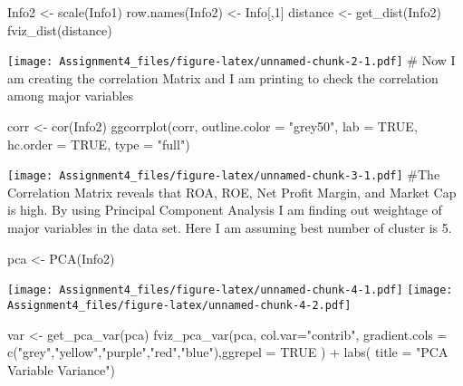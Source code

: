 \documentclass[
]{article}
\newenvironment{Shaded}{\begin{snugshade}}{\end{snugshade}}
\newcommand{\AttributeTok}[1]{\textcolor[rgb]{0.77,0.63,0.00}{#1}}
\newcommand{\ConstantTok}[1]{\textcolor[rgb]{0.00,0.00,0.00}{#1}}
\newcommand{\DecValTok}[1]{\textcolor[rgb]{0.00,0.00,0.81}{#1}}
\newcommand{\FunctionTok}[1]{\textcolor[rgb]{0.00,0.00,0.00}{#1}}
\newcommand{\NormalTok}[1]{#1}
\newcommand{\OtherTok}[1]{\textcolor[rgb]{0.56,0.35,0.01}{#1}}
\newcommand{\SpecialCharTok}[1]{\textcolor[rgb]{0.00,0.00,0.00}{#1}}
\newcommand{\StringTok}[1]{\textcolor[rgb]{0.31,0.60,0.02}{#1}}
\begin{document}
\begin{Shaded}
\begin{Highlighting}[]
\NormalTok{Info2 }\OtherTok{\textless{}{-}} \FunctionTok{scale}\NormalTok{(Info1)}
\FunctionTok{row.names}\NormalTok{(Info2) }\OtherTok{\textless{}{-}}\NormalTok{ Info[,}\DecValTok{1}\NormalTok{]}
\NormalTok{distance }\OtherTok{\textless{}{-}} \FunctionTok{get\_dist}\NormalTok{(Info2)}
\FunctionTok{fviz\_dist}\NormalTok{(distance)}
\end{Highlighting}
\end{Shaded}

\texttt{[image: Assignment4\_files/figure-latex/unnamed-chunk-2-1.pdf]}
\# Now I am creating the correlation Matrix and I am printing to check
the correlation among major variables

\begin{Shaded}
\begin{Highlighting}[]
\NormalTok{corr }\OtherTok{\textless{}{-}} \FunctionTok{cor}\NormalTok{(Info2)}
\FunctionTok{ggcorrplot}\NormalTok{(corr, }\AttributeTok{outline.color =} \StringTok{"grey50"}\NormalTok{, }\AttributeTok{lab =} \ConstantTok{TRUE}\NormalTok{, }\AttributeTok{hc.order =} \ConstantTok{TRUE}\NormalTok{, }\AttributeTok{type =} \StringTok{"full"}\NormalTok{) }
\end{Highlighting}
\end{Shaded}

\texttt{[image: Assignment4\_files/figure-latex/unnamed-chunk-3-1.pdf]}
\#The Correlation Matrix reveals that ROA, ROE, Net Profit Margin, and
Market Cap is high. By using Principal Component Analysis I am finding
out weightage of major variables in the data set. Here I am assuming
best number of cluster is 5.

\begin{Shaded}
\begin{Highlighting}[]
\NormalTok{pca }\OtherTok{\textless{}{-}} \FunctionTok{PCA}\NormalTok{(Info2)}
\end{Highlighting}
\end{Shaded}

\texttt{[image: Assignment4\_files/figure-latex/unnamed-chunk-4-1.pdf]}
\texttt{[image: Assignment4\_files/figure-latex/unnamed-chunk-4-2.pdf]}

\begin{Shaded}
\begin{Highlighting}[]
\NormalTok{var }\OtherTok{\textless{}{-}} \FunctionTok{get\_pca\_var}\NormalTok{(pca)}
\FunctionTok{fviz\_pca\_var}\NormalTok{(pca, }\AttributeTok{col.var=}\StringTok{"contrib"}\NormalTok{,}
             \AttributeTok{gradient.cols =} \FunctionTok{c}\NormalTok{(}\StringTok{"grey"}\NormalTok{,}\StringTok{"yellow"}\NormalTok{,}\StringTok{"purple"}\NormalTok{,}\StringTok{"red"}\NormalTok{,}\StringTok{"blue"}\NormalTok{),}\AttributeTok{ggrepel =} \ConstantTok{TRUE}\NormalTok{ ) }\SpecialCharTok{+} \FunctionTok{labs}\NormalTok{( }\AttributeTok{title =} \StringTok{"PCA Variable Variance"}\NormalTok{)}
\end{Highlighting}
\end{Shaded}
\end{document}
